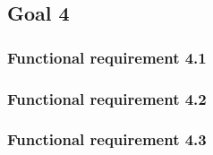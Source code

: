 \subsection{Goal 4}

\setcounter{secnumdepth}{3}
\subsubsection{Functional requirement 4.1}

\subsubsection{Functional requirement 4.2}

\subsubsection{Functional requirement 4.3}
